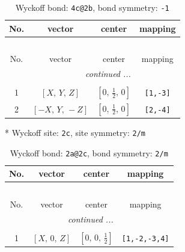 \documentclass[fleqn,8pt]{jsarticle}
\begin{document}
\renewcommand{\arraystretch}{1.2}
\begin{longtable}{cccc}
\caption{Wyckoff bond: {\tt 4c@2b}, bond symmetry: {\tt -1}}
 \\
 \hline \hline
No. & vector & center & mapping \\ \hline \endfirsthead

\multicolumn{3}{l}{\tablename\ \thetable{}} \\
 \hline \hline
No. & vector & center & mapping \\ \hline \endhead

 \hline \hline
\multicolumn{3}{r}{\footnotesize\it continued ...} \\ \endfoot

 \hline \hline
\multicolumn{3}{r}{} \\ \endlastfoot

1 & $\left[ X,\, Y,\, Z \right]$ & $\left[ 0,\, \frac{1}{2},\, 0 \right]$ & {\tt [1,-3]} \\ \hline
2 & $\left[ - X,\, Y,\, - Z \right]$ & $\left[ 0,\, \frac{1}{2},\, 0 \right]$ & {\tt [2,-4]} \\
\end{longtable}
* Wyckoff site: {\tt 2c}, site symmetry: {\tt 2/m}
\renewcommand{\arraystretch}{1.2}
\begin{longtable}{cccc}
\caption{Wyckoff bond: {\tt 2a@2c}, bond symmetry: {\tt 2/m}}
 \\
 \hline \hline
No. & vector & center & mapping \\ \hline \endfirsthead

\multicolumn{3}{l}{\tablename\ \thetable{}} \\
 \hline \hline
No. & vector & center & mapping \\ \hline \endhead

 \hline \hline
\multicolumn{3}{r}{\footnotesize\it continued ...} \\ \endfoot

 \hline \hline
\multicolumn{3}{r}{} \\ \endlastfoot

1 & $\left[ X,\, 0,\, Z \right]$ & $\left[ 0,\, 0,\, \frac{1}{2} \right]$ & {\tt [1,-2,-3,4]} \\
\end{longtable}
\renewcommand{\arraystretch}{1.2}
\end{document}
